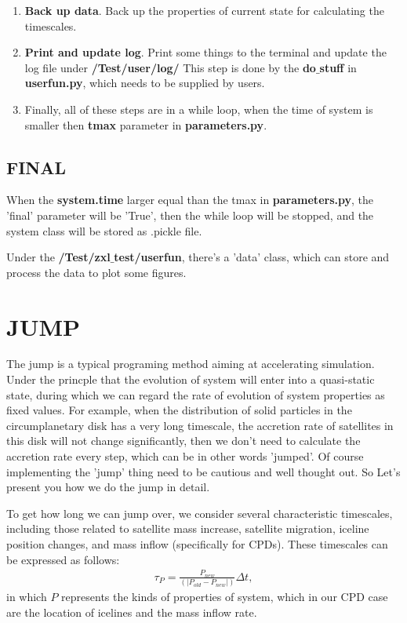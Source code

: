 \documentclass[12pt]{article}
\begin{document}
\begin{enumerate}
    \item \textbf{Back up data}. Back up the properties of current state for calculating the 
        timescales. 

    \item \textbf{Print and update log}. 
        Print some things to the terminal and update the log file under  
        \textbf{/Test/user/log/}
        This step is done by the \textbf{do$\_$stuff} in \textbf{userfun.py}, which 
        needs to be supplied by users. 

    \item Finally, all of these steps are in a while loop, when the time of system 
        is smaller then \textbf{tmax} parameter in \textbf{parameters.py}. 
\end{enumerate}

        
\subsection{FINAL}
When the \textbf{system.time} larger equal than the tmax in \textbf{parameters.py}, 
the 'final' parameter will be 'True', then the while loop 
will be stopped, and the system class will be stored as .pickle file. 

Under the \textbf{/Test/zxl$\_$test/userfun}, there's a 'data' class, which can 
store and process the data to plot some figures.


\section{JUMP}
\label{sec:b}
The jump is a typical programing method aiming at accelerating simulation. Under the 
princple that the evolution of system will enter into a quasi-static state, during which 
we can regard the rate of evolution of system properties as fixed values. For example, 
when the distribution of solid particles in the circumplanetary disk has a very long 
timescale, the accretion rate of satellites in this disk will not change significantly, 
then we don't need to calculate the accretion rate every step, which can be in other 
words 'jumped'. Of course implementing the 'jump' thing need to be cautious and well 
thought out. So Let's present you how we do the jump in detail.

To get how long we can jump over, 
we consider several characteristic timescales, including those related to satellite 
mass increase, satellite migration, iceline position changes, and mass inflow (specifically 
for CPDs). These 
timescales can be expressed as follows:
\begin{align}
    \tau_{P} = \frac{P_{new}}{(|P_{old}-P_{new}|)}\Delta t,
\end{align}
in which $P$ represents the kinds of properties of system, which in our CPD case are 
the location of icelines and the mass inflow rate. 
\end{document}
